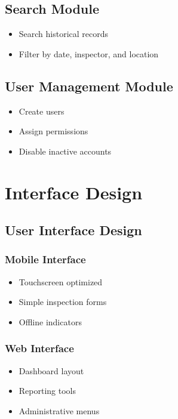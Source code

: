 \documentclass[12pt]{article}
\begin{document}
\subsection{Search Module}

\begin{itemize}
\item Search historical records
\item Filter by date, inspector, and location
\end{itemize}

\subsection{User Management Module}

\begin{itemize}
\item Create users
\item Assign permissions
\item Disable inactive accounts
\end{itemize}

\section{Interface Design}

\subsection{User Interface Design}

\subsubsection*{Mobile Interface}

\begin{itemize}
\item Touchscreen optimized
\item Simple inspection forms
\item Offline indicators
\end{itemize}

\subsubsection*{Web Interface}

\begin{itemize}
\item Dashboard layout
\item Reporting tools
\item Administrative menus
\end{itemize}
\end{document}
